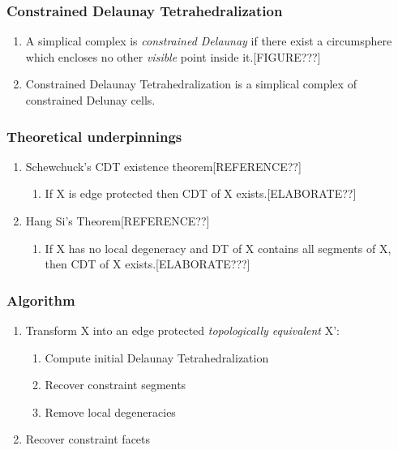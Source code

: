 \documentclass{beamer}
\begin{document}
	\begin{frame}
		\frametitle{Constrained Delaunay Tetrahedralization}
		\begin{enumerate}
			\item A simplical complex is \textit{constrained Delaunay} if there exist a circumsphere which encloses no other \textit{visible} point inside it.[FIGURE???]
			\item Constrained Delaunay Tetrahedralization is a simplical complex of constrained Delunay cells.
		\end{enumerate}
	\end{frame}	
	\begin{frame}
		\frametitle{Theoretical underpinnings}
			\begin{enumerate}
				\item	Schewchuck's CDT existence theorem[REFERENCE??]
					\begin{enumerate}
						\item If X is edge protected then CDT of X exists.[ELABORATE??]	
					\end{enumerate}		
				\item	Hang Si's Theorem[REFERENCE??]
					\begin{enumerate}
						\item If X has no local degeneracy and DT of X contains all segments of X, then CDT of X exists.[ELABORATE???] 
					\end{enumerate}		
			\end{enumerate}		
	\end{frame}	
	\begin{frame}
		\frametitle{Algorithm} 
			\begin{enumerate}
				\item Transform X into an edge protected \textit{topologically equivalent} X':	
				\begin{enumerate}
					\item Compute initial Delaunay Tetrahedralization	
					\item Recover constraint segments
					\item Remove local degeneracies
				\end{enumerate}
				\item Recover constraint facets
			\end{enumerate}		
	\end{frame}
\end{document}
